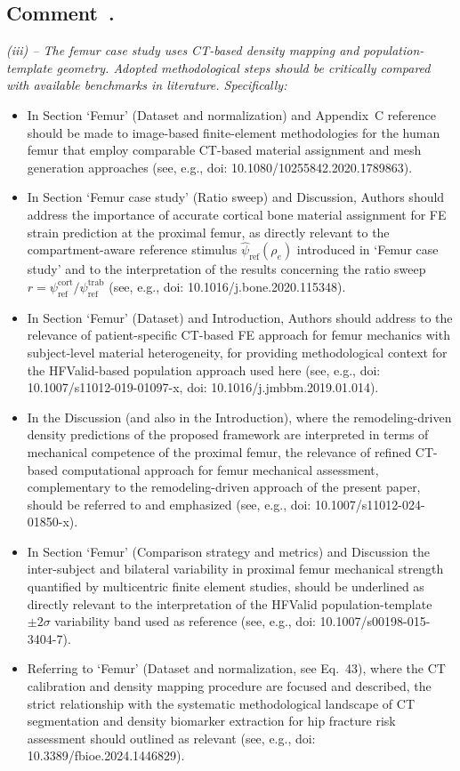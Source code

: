 \documentclass[11pt,a4paper]{article}
\newcounter{reviewer}
\newcounter{comment}[reviewer]
\newcommand{\revcomment}[1]{%
  \refstepcounter{comment}%
  \subsection*{Comment~\thereviewer.\thecomment}%
  {\color{reviewerblue}\itshape #1}%
  \medskip
}
\begin{document}
\revcomment{(iii) -- The femur case study uses CT-based density mapping and population-template geometry. Adopted methodological steps should be critically compared with available benchmarks in literature. Specifically:
\begin{itemize}[nosep]
\item In Section `Femur' (Dataset and normalization) and Appendix~C reference should be made to image-based finite-element methodologies for the human femur that employ comparable CT-based material assignment and mesh generation approaches (see, e.g., doi: 10.1080/10255842.2020.1789863).
\item In Section `Femur case study' (Ratio sweep) and Discussion, Authors should address the importance of accurate cortical bone material assignment for FE strain prediction at the proximal femur, as directly relevant to the compartment-aware reference stimulus $\hat{\psi}_{\mathrm{ref}}(\rho_e)$ introduced in `Femur case study' and to the interpretation of the results concerning the ratio sweep $r = \psi^{\mathrm{cort}}_{\mathrm{ref}} / \psi^{\mathrm{trab}}_{\mathrm{ref}}$ (see, e.g., doi: 10.1016/j.bone.2020.115348).
\item In Section `Femur' (Dataset) and Introduction, Authors should address to the relevance of patient-specific CT-based FE approach for femur mechanics with subject-level material heterogeneity, for providing methodological context for the HFValid-based population approach used here (see, e.g., doi: 10.1007/s11012-019-01097-x, doi: 10.1016/j.jmbbm.2019.01.014).
\item In the Discussion (and also in the Introduction), where the remodeling-driven density predictions of the proposed framework are interpreted in terms of mechanical competence of the proximal femur, the relevance of refined CT-based computational approach for femur mechanical assessment, complementary to the remodeling-driven approach of the present paper, should be referred to and emphasized (see, e.g., doi: 10.1007/s11012-024-01850-x).
\item In Section `Femur' (Comparison strategy and metrics) and Discussion the inter-subject and bilateral variability in proximal femur mechanical strength quantified by multicentric finite element studies, should be underlined as directly relevant to the interpretation of the HFValid population-template $\pm 2\sigma$ variability band used as reference (see, e.g., doi: 10.1007/s00198-015-3404-7).
\item Referring to `Femur' (Dataset and normalization, see Eq.~43), where the CT calibration and density mapping procedure are focused and described, the strict relationship with the systematic methodological landscape of CT segmentation and density biomarker extraction for hip fracture risk assessment should outlined as relevant (see, e.g., doi: 10.3389/fbioe.2024.1446829).
\end{itemize}}
\end{document}
